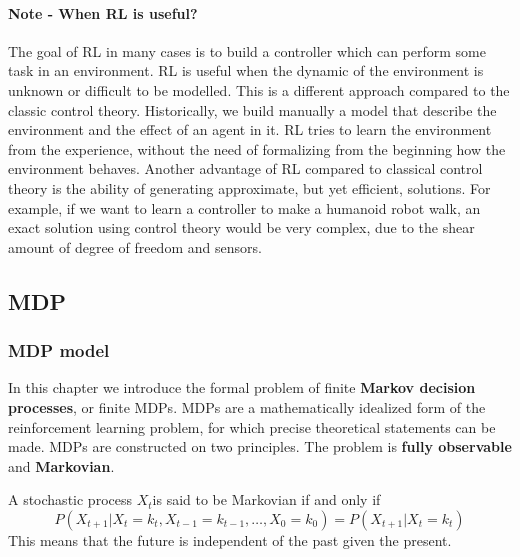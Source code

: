 \documentclass[main.tex]{subfiles}
\begin{document}
\paragraph{Note - When RL is useful?} The goal of RL in many cases is to build a controller which can perform some task in an environment. RL is useful when the dynamic of the environment is unknown or difficult to be modelled. This is a different approach compared to the classic control theory. Historically, we build manually a model that describe the environment and the effect of an agent in it. RL tries to learn the environment from the experience, without the need of formalizing from the beginning how the environment behaves. Another advantage of RL compared to classical control theory is the ability of generating approximate, but yet efficient, solutions. For example, if we want to learn a controller to make a humanoid robot walk, an exact solution using control theory would be very complex, due to the shear amount of degree of freedom and sensors. 

\subsection{MDP}
\subsubsection{MDP model}
In this chapter we introduce the formal problem of finite \textbf{Markov decision processes}, or finite MDPs. MDPs are a mathematically idealized form of the reinforcement learning problem, for which precise theoretical statements can be made. MDPs are constructed on two principles. The problem is \textbf{fully observable} and \textbf{Markovian}.
\begin{definition}
A stochastic process $X_t$\footnotemark is said to be Markovian if and only if 
\begin{equation*}
    P(X_{t+1}|X_t=k_t,X_{t-1}=k_{t-1}, \dots, X_0=k_0) = P(X_{t+1}|X_{t}=k_t)
\end{equation*}
This means that the future is independent of the past given the present.
\end{definition}
\end{document}
